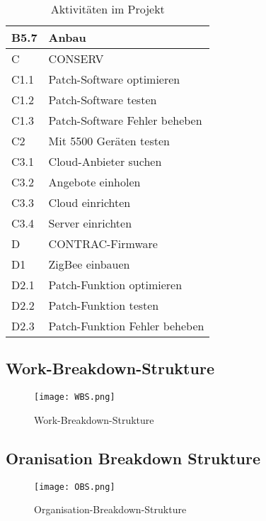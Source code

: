 \begin{table}[H]
\begin{center}
\begin{tabular}{l|l}
            B5.7 & Anbau                                               \\ \hline
            C    & CONSERV                                             \\ \hline
            C1.1 & Patch-Software optimieren                           \\ \hline
            C1.2 & Patch-Software testen                               \\ \hline
            C1.3 & Patch-Software Fehler beheben                       \\ \hline
            C2   & Mit 5500 Geräten testen                             \\ \hline
            C3.1 & Cloud-Anbieter suchen                               \\ \hline
            C3.2 & Angebote einholen                                   \\ \hline
            C3.3 & Cloud einrichten                                    \\ \hline
            C3.4 & Server einrichten                                   \\ \hline
            D    & CONTRAC-Firmware                                    \\ \hline
            D1   & ZigBee einbauen                                     \\ \hline
            D2.1 & Patch-Funktion optimieren                           \\ \hline
            D2.2 & Patch-Funktion testen                               \\ \hline
            D2.3 & Patch-Funktion Fehler beheben                       \\
        \end{tabular}
        \caption{Aktivitäten im Projekt}
    \end{center}
\end{table}

\subsection{Work-Breakdown-Strukture}
\begin{figure}[H]
    \begin{center}
        \texttt{[image: WBS.png]}
    \end{center}
    \caption{Work-Breakdown-Strukture}
\end{figure}
\subsection{Oranisation Breakdown Strukture}
\begin{figure}[H]
    \begin{center}
        \texttt{[image: OBS.png]}
    \end{center}
    \caption{Organisation-Breakdown-Strukture}
\end{figure}

